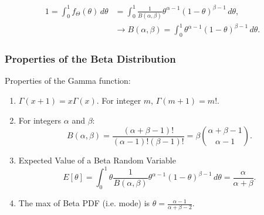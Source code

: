 \begin{derivation}
    \begin{align*}
        1 = \int_0^1 f_\Theta(\theta) \, d\theta &= \int_0^1 \frac{1}{B(\alpha, \beta)} \theta^{\alpha-1} (1-\theta)^{\beta-1} \, d\theta, \\
        &\rightarrow B(\alpha, \beta) = \int_0^1 \theta^{\alpha-1} (1 - \theta)^{\beta-1} \, d\theta.
    \end{align*}
\end{derivation}

\subsubsection{Properties of the Beta Distribution}
\begin{definition}
    Properties of the Gamma function:
    \begin{enumerate}
        \item $\Gamma(x+1) = x \Gamma(x)$. For integer $m$, $\Gamma(m+1) = m!$.
        \item For integers $\alpha$ and $\beta$:
        \[
        B(\alpha, \beta) = \frac{(\alpha+\beta-1)!}{(\alpha-1)!(\beta-1)!} = \beta \binom{\alpha+\beta-1}{\alpha-1}.
        \]
        \item Expected Value of a Beta Random Variable
        \[
        E[\theta] = \int_0^1 \theta \frac{1}{B(\alpha, \beta)} \theta^{\alpha-1} (1-\theta)^{\beta-1} \, d\theta = \frac{\alpha}{\alpha + \beta}.
        \]
        \item The max of Beta PDF (i.e. mode) is $\theta = \frac{\alpha - 1}{\alpha + \beta - 2}$.
    \end{enumerate}
\end{definition}

